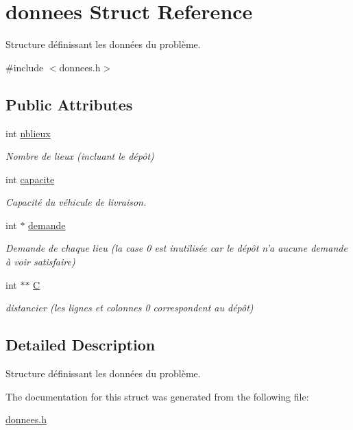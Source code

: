 \hypertarget{structdonnees}{\section{donnees \-Struct \-Reference}
\label{structdonnees}
}


\-Structure définissant les données du problème.  




{\ttfamily \#include $<$donnees.\-h$>$}

\subsection*{\-Public \-Attributes}
\begin{DoxyCompactItemize}
\item 
\hypertarget{structdonnees_aa9d976132f61d4d3d1ab846349919a59}{int \hyperlink{structdonnees_aa9d976132f61d4d3d1ab846349919a59}{nblieux}}\label{structdonnees_aa9d976132f61d4d3d1ab846349919a59}

\begin{DoxyCompactList}\small\item\em \-Nombre de lieux (incluant le dépôt) \end{DoxyCompactList}\item 
\hypertarget{structdonnees_a5c9d364da8a90f354617da181a37eb94}{int \hyperlink{structdonnees_a5c9d364da8a90f354617da181a37eb94}{capacite}}\label{structdonnees_a5c9d364da8a90f354617da181a37eb94}

\begin{DoxyCompactList}\small\item\em \-Capacité du véhicule de livraison. \end{DoxyCompactList}\item 
\hypertarget{structdonnees_a34cd14d3d17282fce557b634e1e8e2ff}{int $\ast$ \hyperlink{structdonnees_a34cd14d3d17282fce557b634e1e8e2ff}{demande}}\label{structdonnees_a34cd14d3d17282fce557b634e1e8e2ff}

\begin{DoxyCompactList}\small\item\em \-Demande de chaque lieu (la case 0 est inutilisée car le dépôt n'a aucune demande à voir satisfaire) \end{DoxyCompactList}\item 
\hypertarget{structdonnees_af03f1f723c3cadea1346e006a5747fc2}{int $\ast$$\ast$ \hyperlink{structdonnees_af03f1f723c3cadea1346e006a5747fc2}{\-C}}\label{structdonnees_af03f1f723c3cadea1346e006a5747fc2}

\begin{DoxyCompactList}\small\item\em distancier (les lignes et colonnes 0 correspondent au dépôt) \end{DoxyCompactList}\end{DoxyCompactItemize}


\subsection{\-Detailed \-Description}
\-Structure définissant les données du problème. 

\-The documentation for this struct was generated from the following file\-:\begin{DoxyCompactItemize}
\item 
\hyperlink{donnees_8h}{donnees.\-h}\end{DoxyCompactItemize}
